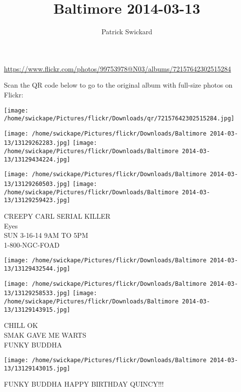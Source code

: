\documentclass[10pt,letterpaper]{article}
\title{Baltimore 2014-03-13}
\author{Patrick Swickard}
\date{}
\begin{document}
\maketitle

\url{https://www.flickr.com/photos/99753978@N03/albums/72157642302515284}

Scan the QR code below to go to the original album with full-size photos on Flickr:

\texttt{[image: /home/swickape/Pictures/flickr/Downloads/qr/72157642302515284.jpg]}
\pagebreak

\texttt{[image: /home/swickape/Pictures/flickr/Downloads/Baltimore 2014-03-13/13129262283.jpg]}
\texttt{[image: /home/swickape/Pictures/flickr/Downloads/Baltimore 2014-03-13/13129434224.jpg]}

\texttt{[image: /home/swickape/Pictures/flickr/Downloads/Baltimore 2014-03-13/13129260503.jpg]}
\texttt{[image: /home/swickape/Pictures/flickr/Downloads/Baltimore 2014-03-13/13129259423.jpg]}

CREEPY CARL SERIAL KILLER\\
Eyes\\
SUN 3{-}16{-}14 9AM TO 5PM\\
1{-}800{-}NGC{-}FOAD
\pagebreak

\texttt{[image: /home/swickape/Pictures/flickr/Downloads/Baltimore 2014-03-13/13129432544.jpg]}

\vspace{0.25in}
\texttt{[image: /home/swickape/Pictures/flickr/Downloads/Baltimore 2014-03-13/13129258533.jpg]}
\texttt{[image: /home/swickape/Pictures/flickr/Downloads/Baltimore 2014-03-13/13129143915.jpg]}

CHILL OK\\
SMAK GAVE ME WARTS\\
FUNKY BUDDHA
\pagebreak

\texttt{[image: /home/swickape/Pictures/flickr/Downloads/Baltimore 2014-03-13/13129143015.jpg]}

FUNKY BUDDHA HAPPY BIRTHDAY QUINCY!!!
\pagebreak
\end{document}

